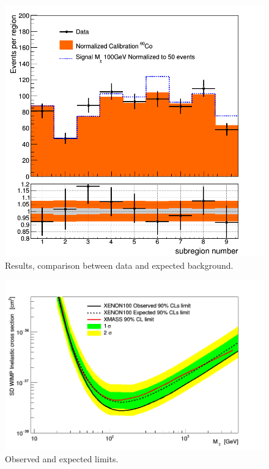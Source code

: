 \newpage
\begin{figure}[t!]
  \includegraphics[width=\linewidth]{images/data_vs_bkg.png}
  \caption{Results, comparison between data and expected background.}
  \label{fig:dataVSbkg}
\end{figure}

\begin{figure}[h]
  \includegraphics[width=\linewidth]{images/limit_reb.png}
  \caption{Observed and expected limits.}
  \label{fig:limits}
\end{figure}


\newpage
